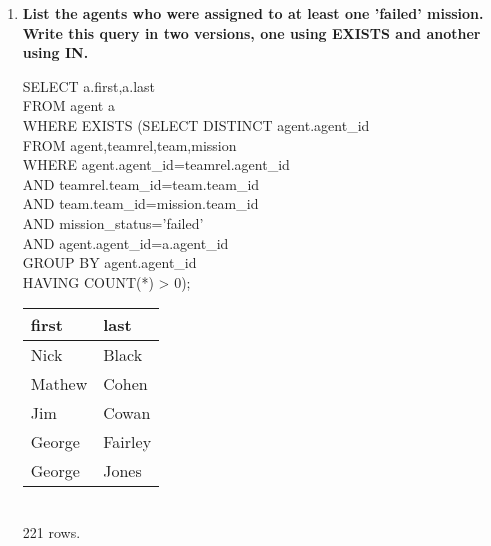 \documentclass{article}
\begin{document}
\begin{enumerate}
\item
\textbf{List the agents who were assigned to at least one 'failed' mission. Write this
query in two versions, one using EXISTS and another using IN.\\}

SELECT a.first,a.last\\
FROM agent a\\
WHERE EXISTS (SELECT DISTINCT agent.agent\_id\\
\hspace*{3 cm}FROM agent,teamrel,team,mission\\
\hspace*{3 cm}WHERE agent.agent\_id=teamrel.agent\_id\\
\hspace*{3 cm}AND teamrel.team\_id=team.team\_id\\
\hspace*{3 cm}AND team.team\_id=mission.team\_id\\
\hspace*{3 cm}AND mission\_status='failed'\\
\hspace*{3 cm}AND agent.agent\_id=a.agent\_id\\
\hspace*{3 cm}GROUP BY agent.agent\_id\\
\hspace*{3 cm}HAVING COUNT(*) > 0);\\
\begin{tabular}{l|l}
first   &      last       \\
\hline
 Nick      & Black\\
 Mathew    & Cohen\\
 Jim       & Cowan\\
 George    & Fairley\\
 George    & Jones\\
\end{tabular}
\\221 rows.\\


\end{enumerate}
\end{document}
